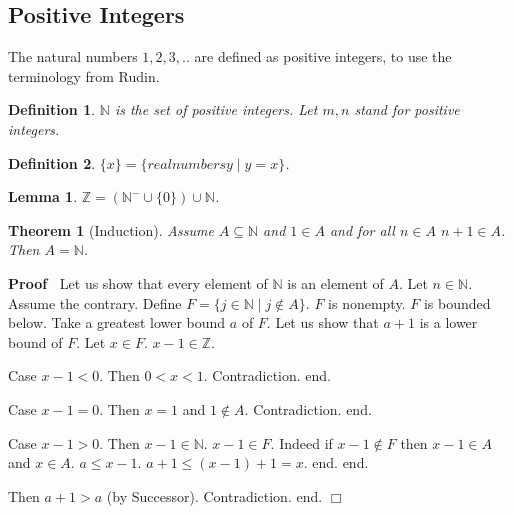 \documentclass{article}
\newenvironment{forthel}{\begin{leftbar}}{\end{leftbar}}
\newenvironment{proof}{\noindent\textbf{Proof\ }}{\hspace*{\fill}$\Box$\medskip}
\newtheorem{lemma}{Lemma}
\newtheorem{theorem}{Theorem}
\newtheorem{definition}{Definition}
\newcommand{\ZZ}{\mathbb{Z}}
\newcommand{\NN}{\mathbb{N}}
\begin{document}
\subsection{Positive Integers}
The natural numbers $1,2,3,..$ are defined as positive integers, to use the terminology from Rudin.
\begin{forthel}


\begin{definition} $\NN$ is the set of positive integers.
Let $m,n$ stand for positive integers.\end{definition}

\begin{definition} $\{x\} = \{real numbers y \mid y = x\}$.
\end{definition}

\begin{lemma} $\ZZ = (\NN^- \cup \{0\}) \cup \NN$.
\end{lemma}

\begin{theorem}[Induction] Assume $A \subseteq \NN$ 
and $1 \in A$ and for all $n \in A$ $n + 1 \in A$.
Then $A = \NN$.\end{theorem}

\begin{proof}
Let us show that every element of $\NN$ is an element of $A$. 
	Let $n \in \NN$.
	Assume the contrary.
	Define $F = \{ j \in \NN \mid j \notin A\}$.
	$F$ is nonempty. $F$ is bounded below.
  Take a greatest lower bound $a$ of $F$.
	Let us show that $a+1$ is a lower bound of $F$.
		Let $x \in F$. $x - 1 \in \ZZ$.
		
		Case $x - 1 < 0$. Then $0 < x < 1$. Contradiction. end.

		Case $x - 1 = 0$. Then $x = 1$ and $1 \notin A$. Contradiction. end.
		
		Case $x - 1 > 0$. Then $x - 1 \in \NN$. $x - 1 \in F$.
		    Indeed if $x -1 \notin F$ then $x-1 \in A$ and $x \in A$. 
			$a \leq x - 1$.
			$a + 1 \leq (x - 1) + 1 = x$.
			end.
	end.
	
	Then $a+1 > a$ (by Successor).
	Contradiction.
end.
\end{proof}

\end{forthel}
\end{document}

